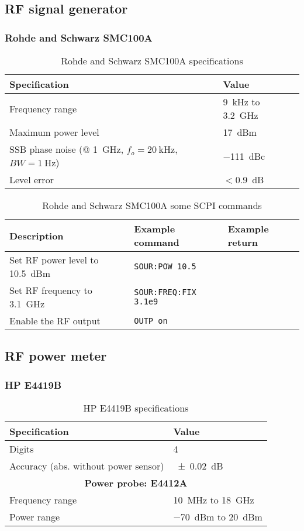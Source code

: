 \subsection{RF signal generator}
\subsubsection{Rohde and Schwarz SMC100A}
\begin{table}[H]
	\centering
	\caption{Rohde and Schwarz SMC100A specifications}
	\label{tab:rs-smc100a-specs}
	\begin{tabularx}{\textwidth}{ll}
		\toprule
		\textbf{Specification} & \textbf{Value}\\
		\midrule
		Frequency range & \SI{9}{\kHz} to \SI{3.2}{\GHz}\\
		Maximum power level & \SI{17}{dBm}\\
		SSB phase noise (@ \SI{1}{\GHz}, $f_o=\SI{20}{\kHz}$, $BW=\SI{1}{\Hz}$) & \SI{-111}{dBc}\\
		Level error & $<$\SI{0.9}{\dB}\\
		\bottomrule
	\end{tabularx}
\end{table}

\begin{table}[H]
	\centering
	\caption{Rohde and Schwarz SMC100A some SCPI commands}
	\label{tab:rs-smc100a-scpi}
	\begin{tabularx}{\textwidth}{Xll}
		\toprule
		\textbf{Description} & \textbf{Example command} & \textbf{Example return}\\
		\midrule
		Set RF power level to \SI{10.5}{dBm} & \texttt{SOUR:POW 10.5} & \\
		Set RF frequency to \SI{3.1}{\GHz}& \texttt{SOUR:FREQ:FIX {3.1e9}} & \\
		Enable the RF output & \texttt{OUTP on} & \\
		\bottomrule
	\end{tabularx}
\end{table}

\subsection{RF power meter}
\subsubsection{HP E4419B}
\begin{table}[H]
	\centering
	\caption{HP E4419B specifications}
	\label{tab:hp-E4419B-specs}
	\begin{tabularx}{\textwidth}{ll}
		\toprule
		\textbf{Specification} & \textbf{Value}\\
		\midrule
		Digits & 4\\
		Accuracy (abs. without power sensor) & \SI{+-0.02}{\dB} \\
		\multicolumn{2}{c}{\textbf{Power probe: E4412A}}\\
		Frequency range & \SI{10}{\MHz} to \SI{18}{\GHz}\\
		Power range & \SI{-70}{dBm} to \SI{20}{dBm}\\
		\bottomrule
	\end{tabularx}
\end{table}

